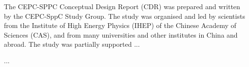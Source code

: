 \documentclass{Style/wileysev}
\begin{document}
\subtitle{\fontsize{27}{32} \\ \vspace{30pt}
\fontsize{26}{32} \\ \vspace{260pt}
\huge{} \\ \vspace{18pt}
\huge{} \\
\vspace{-720pt}
\hfill \Large{\selectfont{IHEP-CEPC-DR-2018-XX}} \\ \vspace{15pt}
\hfill \Large{\selectfont{IHEP-EP-2018-XX}} \\ \vspace{15pt}
\hfill \Large{\selectfont{IHEP-TH-2018-XX}} 
}

\authors{}
\offprintinfo{}{}


\titlepage


%




\begin{acknowledgments}
The CEPC-SPPC Conceptual Design Report (CDR) was prepared and written by the CEPC-SppC Study Group. The study was organised and led by scientists from the Institute of High Energy Physics (IHEP) of the Chinese Academy of Sciences (CAS), and from many universities and other institutes in China and abroad. The study was partially supported ...


...

\end{acknowledgments}




\tableofcontents
















\end{document}
